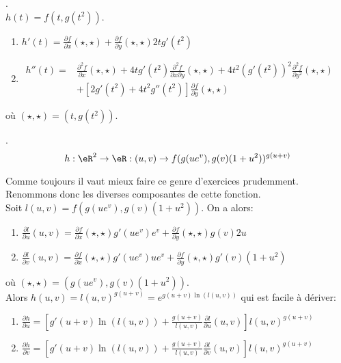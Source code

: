 \vspace{1cm}


. \\

\noindent $h(t)=f(t,g(t^2))$.\\

\begin{enumerate}
    \item $h'(t)=\frac{ \partial f }{ \partial x }(\star,\star)+\frac{ \partial f }{ \partial y }(\star,\star)2tg'(t^2)$
    \item $ \begin{array}{rl} h''(t)=     &   \frac{ \partial^2f }{ \partial x }(\star,\star)+4tg'(t^2)\frac{ \partial^2f }{ \partial x\partial y }(\star,\star)+4t^2(g'(t^2))^2\frac{ \partial^2f }{ \partial y^2 }(\star,\star) \\           
        & +[2g'(t^2)+4t^2g''(t^2)]\frac{ \partial f }{ \partial y }(\star,\star)\end{array}$

\end{enumerate}
où $(\star,\star) = (t,g(t^2))$.

\vspace{1cm}

.
\[h:\eR^2\rightarrow \eR:(u,v)\rightarrow  f(g(ue^v),g(v)(1+u^2))^{g(u+v)}\]

\noindent Comme toujours il vaut mieux faire ce genre d'exercices prudemment. Renommons donc les diverses composantes de cette fonction.\\

\noindent Soit $l(u,v)=f(g(ue^v),g(v)(1+u^2))$. On a alors:
\begin{enumerate}
    \item $\frac{ \partial l }{ \partial u }(u,v) = \frac{ \partial f }{ \partial x }(\star,\star)g'(ue^v)e^v + \frac{ \partial f }{ \partial y }(\star,\star)g(v)2u$
    \item $\frac{ \partial l }{ \partial v }(u,v) = \frac{ \partial f }{ \partial x }(\star,\star)g'(ue^v)ue^v+\frac{ \partial f }{ \partial y }(\star,\star)g'(v)(1+u^2)$
\end{enumerate}
o\`{u} $(\star,\star)=(g(ue^v),g(v)(1+u^2))$.\\

\noindent Alors $h(u,v)=l(u,v)^{g(u+v)} = e^{g(u+v)\ln(l(u,v))}$ qui est facile à dériver:

\begin{enumerate}
    \item $\frac{ \partial h }{ \partial u } = [g'(u+v)\ln(l(u,v))+\frac{g(u+v)}{l(u,v)}\frac{ \partial l }{ \partial u }(u,v)] l(u,v)^{g(u+v)}$
    \item $\frac{ \partial h }{ \partial v } = [g'(u+v)\ln(l(u,v))+\frac{g(u+v)}{l(u,v)}\frac{ \partial l }{ \partial v }(u,v)] l(u,v)^{g(u+v)}$
\end{enumerate}




